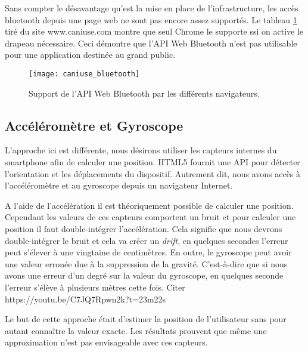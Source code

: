 Sans compter le désavantage qu'est la mise en place de l'infrastructure, les accès bluetooth depuis une page web ne sont pas encore assez supportés. Le tableau \ref{caniuse-bluetooth} tiré du site www.caniuse.com montre que seul Chrome le supporte ssi on active le drapeau nécessaire. Ceci démontre que l'API Web Bluetooth n'est pas utilisable pour une application destinée au grand public.

\begin{figure}[h!]
	\center
	\texttt{[image: caniuse\_bluetooth]}
	\caption{Support de l'API Web Bluetooth par les différents navigateurs.}
	\label{caniuse-bluetooth}
\end{figure}

\subsection{Accéléromètre et Gyroscope}
L'approche ici est différente, nous désirons utiliser les capteurs internes du smartphone afin de calculer une position. HTML5 fournit une API pour détecter l'orientation et les déplacements du dispositif. Autrement dit, nous avons accès à l'accéléromètre et au gyroscope depuis un navigateur Internet.

A l'aide de l'accélération il est théoriquement possible de calculer une position. Cependant les valeurs de ces capteurs comportent un bruit et pour calculer une position il faut double-intégrer l'accélération. Cela signifie que nous devrons double-intégrer le bruit et cela va créer un \textit{drift}, en quelques secondes l'erreur peut s'élever à une vingtaine de centimètres. En outre, le gyroscope peut avoir une valeur erronée due à la suppression de la gravité. C'est-à-dire que si nous avons une erreur d'un degré sur la valeur du gyroscope, en quelques seconde l'erreur s'élève à plusieurs mètres cette fois. Citer https://youtu.be/C7JQ7Rpwn2k?t=23m22s

Le but de cette approche était d'estimer la position de l'utilisateur sans pour autant connaître la valeur exacte. Les résultats prouvent que même une approximation n'est pas envisageable avec ces capteurs.